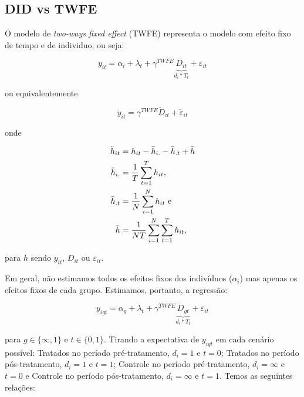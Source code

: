 \documentclass[portugues]{article}
\begin{document}

\subsection{DID vs TWFE}

O modelo de \textit{two-ways fixed effect} (TWFE) representa o modelo com efeito fixo de tempo e de individuo, ou seja:

\begin{equation}\label{eq:1_twfe_a}
    y_{it} = \alpha_i + \lambda_t + \gamma^{TWFE} \underbrace{D_{it}}_{d_i * T_t} + \varepsilon_{it}
\end{equation}

\noindent ou equivalentemente

\begin{equation*}
    \ddot{y}_{it} = \gamma^{TWFE} \ddot{D}_{it} + \ddot{\varepsilon}_{it}
\end{equation*}

\noindent onde

\[
\begin{split}
    \ddot{h}_{it}   &= h_{it} - \Bar{h}_{i.} - \Bar{h}_{.t} + \bar{h}\\
    \Bar{h}_{i.}    &= \frac{1}{T} \sum_{t=1}^{T} h_{it}, \\
    \Bar{h}_{.t}    &= \frac{1}{N} \sum_{i=1}^{N} h_{it} \text{ e } \\
    \Bar{h}         &= \frac{1}{NT} \sum_{i=1}^{N} \sum_{t=1}^{T} h_{it},
\end{split}
\]

\noindent para $h$ sendo $y_{it}$, $D_{it}$ ou $\varepsilon_{it}$.

Em geral, não estimamos todos os efeitos fixos dos indivíduos ($\alpha_i$) mas apenas os efeitos fixos de cada grupo. Estimamos, portanto, a regressão:

\begin{equation}\label{eq:1_twfe}
    y_{igt} = \alpha_g + \lambda_t + \gamma^{TWFE} \underbrace{D_{gt}}_{d_i * T_t} + \varepsilon_{it}
\end{equation}

\noindent para $g \in \{\infty, 1\}$ e $t \in \{0,1\}$. Tirando a expectativa de $y_{igt}$ em cada cenário possível: Tratados no período pré-tratamento, $d_i=1$ e $t=0$; Tratados no período pós-tratamento, $d_i=1$ e $t=1$; Controle no período pré-tratamento, $d_i=\infty$ e $t=0$ e Controle no período pós-tratamento, $d_i=\infty$ e $t=1$. Temos as seguintes relações:
\end{document}
